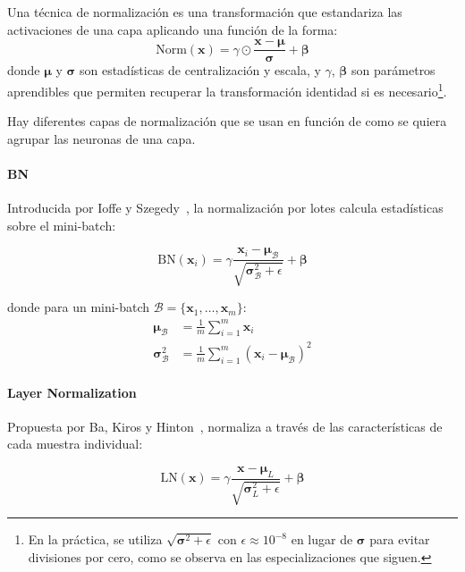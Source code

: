\begin{definition}\label{def:normalizacion}
	Una técnica de normalización es una transformación que estandariza las activaciones de una capa aplicando una función de la forma:
	\[
	\text{Norm}(\mathbf{x}) = \gamma \odot \frac{\mathbf{x} - \boldsymbol{\mu}}{\boldsymbol{\sigma}} + \boldsymbol{\beta}
	\]
	donde $\boldsymbol{\mu}$ y $\boldsymbol{\sigma}$ son estadísticas de centralización y escala, y $\gamma$, $\boldsymbol{\beta}$ son parámetros aprendibles que permiten recuperar la transformación identidad si es necesario\footnote{En la práctica, se utiliza $\sqrt{\boldsymbol{\sigma}^2 + \epsilon}$ con $\epsilon \approx 10^{-8}$ en lugar de $\boldsymbol{\sigma}$ para evitar divisiones por cero, como se observa en las especializaciones que siguen.}.
\end{definition}

Hay diferentes capas de normalización que se usan en función de como se quiera agrupar las neuronas de una capa.

\paragraph{\gls{BN}}

Introducida por Ioffe y Szegedy~\citep{ioffe2015batch}, la normalización por lotes calcula estadísticas sobre el mini-batch:

\[
\text{BN}(\mathbf{x}_i) = \gamma \frac{\mathbf{x}_i - \boldsymbol{\mu}_{\mathcal{B}}}{\sqrt{\boldsymbol{\sigma}^2_{\mathcal{B}} + \epsilon}} + \boldsymbol{\beta}
\]

donde para un mini-batch $\mathcal{B} = \{\mathbf{x}_1, \ldots, \mathbf{x}_m\}$:
\begin{align}
\boldsymbol{\mu}_{\mathcal{B}} &= \frac{1}{m} \sum_{i=1}^m \mathbf{x}_i \\
\boldsymbol{\sigma}^2_{\mathcal{B}} &= \frac{1}{m} \sum_{i=1}^m (\mathbf{x}_i - \boldsymbol{\mu}_{\mathcal{B}})^2
\end{align}

\paragraph{Layer Normalization}

Propuesta por Ba, Kiros y Hinton~\citep{ba2016layer}, normaliza a través de las características de cada muestra individual:

\[
\text{LN}(\mathbf{x}) = \gamma \frac{\mathbf{x} - \boldsymbol{\mu}_L}{\sqrt{\boldsymbol{\sigma}^2_L + \epsilon}} + \boldsymbol{\beta}
\]

